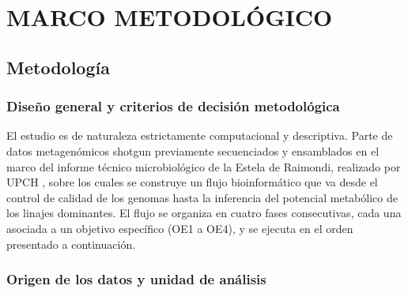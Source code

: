 \chapter{ MARCO METODOLÓGICO}

\section{Metodología}

\subsection{Diseño general y criterios de decisión metodológica}

El estudio es de naturaleza estrictamente computacional y descriptiva. Parte de datos metagenómicos shotgun previamente secuenciados y ensamblados en el marco del informe técnico microbiológico de la Estela de Raimondi, realizado por UPCH \cite{tsukayama2025informe}, sobre los cuales se construye un flujo bioinformático que va desde el control de calidad de los genomas hasta la inferencia del potencial metabólico de los linajes dominantes. El flujo se organiza en cuatro fases consecutivas, cada una asociada a un objetivo específico (OE1 a OE4), y se ejecuta en el orden presentado a continuación.

\subsection{Origen de los datos y unidad de análisis}


